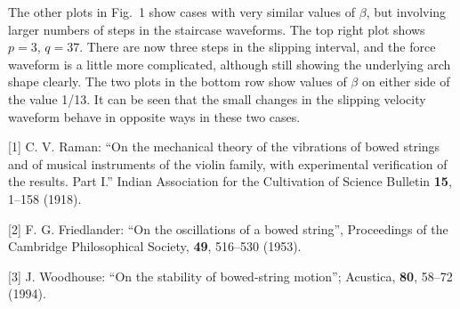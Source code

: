 

  The other plots in Fig.\ 1 show cases with very similar values of $\beta$, 
  but involving larger numbers of steps in the staircase waveforms. The top 
  right plot shows $p=3$, $q=37$. There are now three steps in the slipping 
  interval, and the force waveform is a little more complicated, although still 
  showing the underlying arch shape clearly. The two plots in the bottom row 
  show values of $\beta$ on either side of the value 1/13. It can be seen that 
  the small changes in the slipping velocity waveform behave in opposite ways 
  in these two cases. 

  \sectionreferences{}[1] C. V. Raman: ``On the mechanical theory of the 
  vibrations of bowed strings and of musical instruments of the violin family, 
  with experimental verification of the results. Part I.'' Indian Association 
  for the Cultivation of Science Bulletin \textbf{15}, 1–158 (1918). 

  [2] F. G. Friedlander: ``On the oscillations of a bowed string'', Proceedings 
  of the Cambridge Philosophical Society, \textbf{49}, 516--530 (1953). 

  [3] J. Woodhouse: ``On the stability of bowed-string motion''; Acustica, 
  \textbf{80}, 58--72 (1994). 